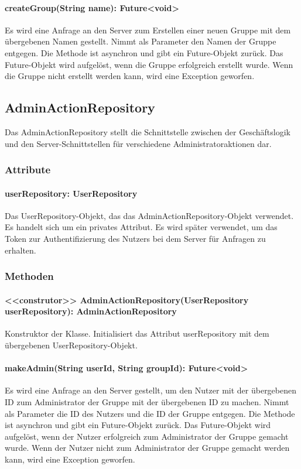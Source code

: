 \documentclass[parskip=full]{scrartcl}
\begin{document}
\paragraph{createGroup(String name): Future<void>}
Es wird eine Anfrage an den Server zum Erstellen einer neuen Gruppe mit dem übergebenen Namen gestellt. Nimmt als Parameter den Namen der Gruppe entgegen. Die Methode ist asynchron und gibt ein Future-Objekt zurück. Das Future-Objekt wird aufgelöst, wenn die Gruppe erfolgreich erstellt wurde. Wenn die Gruppe nicht erstellt werden kann, wird eine Exception geworfen.
\subsection{AdminActionRepository}
Das AdminActionRepository stellt die Schnittstelle zwischen der Geschäftslogik und den Server-Schnittstellen für verschiedene Administratoraktionen dar.
\subsubsection{Attribute}
\paragraph{userRepository: UserRepository}
Das UserRepository-Objekt, das das AdminActionRepository-Objekt verwendet. Es handelt sich um ein privates Attribut. Es wird später verwendet, um das Token zur Authentifizierung des Nutzers bei dem Server für Anfragen zu erhalten.
\subsubsection{Methoden}
\paragraph{<<construtor>> AdminActionRepository(UserRepository userRepository): AdminActionRepository}
Konstruktor der Klasse. Initialisiert das Attribut userRepository mit dem übergebenen UserRepository-Objekt.
\paragraph{makeAdmin(String userId, String groupId): Future<void>}
Es wird eine Anfrage an den Server gestellt, um den Nutzer mit der übergebenen ID zum Administrator der Gruppe mit der übergebenen ID zu machen. Nimmt als Parameter die ID des Nutzers und die ID der Gruppe entgegen. Die Methode ist asynchron und gibt ein Future-Objekt zurück. Das Future-Objekt wird aufgelöst, wenn der Nutzer erfolgreich zum Administrator der Gruppe gemacht wurde. Wenn der Nutzer nicht zum Administrator der Gruppe gemacht werden kann, wird eine Exception geworfen.
\end{document}
